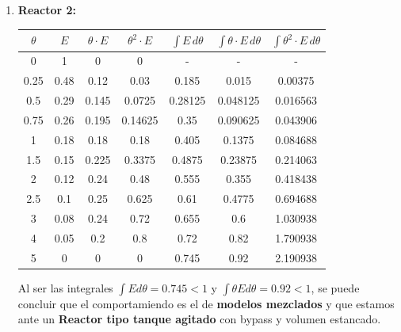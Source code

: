 \begin{enumerate}[label={\alph*)}]
	\item \textbf{Reactor 2:}
	      \begin{center}
		      \begin{tabular}{|c|c|c|c|c|c|c|}
			      \hline
			      $\theta$ & $E$  & $\theta \cdot E$ & $\theta^2 \cdot E$ & $\int E \, d\theta$ & $\int \theta \cdot E \, d\theta$ & $\int \theta^2 \cdot E \, d\theta$ \\ \hline
			      0        & 1    & 0                & 0                  & -                   & -                                & -                                  \\ \hline
			      0.25     & 0.48 & 0.12             & 0.03               & 0.185               & 0.015                            & 0.00375                            \\ \hline
			      0.5      & 0.29 & 0.145            & 0.0725             & 0.28125             & 0.048125                         & 0.016563                           \\ \hline
			      0.75     & 0.26 & 0.195            & 0.14625            & 0.35                & 0.090625                         & 0.043906                           \\ \hline
			      1        & 0.18 & 0.18             & 0.18               & 0.405               & 0.1375                           & 0.084688                           \\ \hline
			      1.5      & 0.15 & 0.225            & 0.3375             & 0.4875              & 0.23875                          & 0.214063                           \\ \hline
			      2        & 0.12 & 0.24             & 0.48               & 0.555               & 0.355                            & 0.418438                           \\ \hline
			      2.5      & 0.1  & 0.25             & 0.625              & 0.61                & 0.4775                           & 0.694688                           \\ \hline
			      3        & 0.08 & 0.24             & 0.72               & 0.655               & 0.6                              & 1.030938                           \\ \hline
			      4        & 0.05 & 0.2              & 0.8                & 0.72                & 0.82                             & 1.790938                           \\ \hline
			      5        & 0    & 0                & 0                  & 0.745               & 0.92                             & 2.190938                           \\ \hline
		      \end{tabular}
	      \end{center}
	      \noindent Al ser las integrales $\int E d\theta=0.745 < 1$ y $\int \theta E d\theta=0.92 < 1$, se puede concluir que el comportamiendo es el de \textbf{modelos mezclados} y que estamos ante un \textbf{Reactor tipo tanque agitado} con bypass y volumen estancado.


\end{enumerate}
